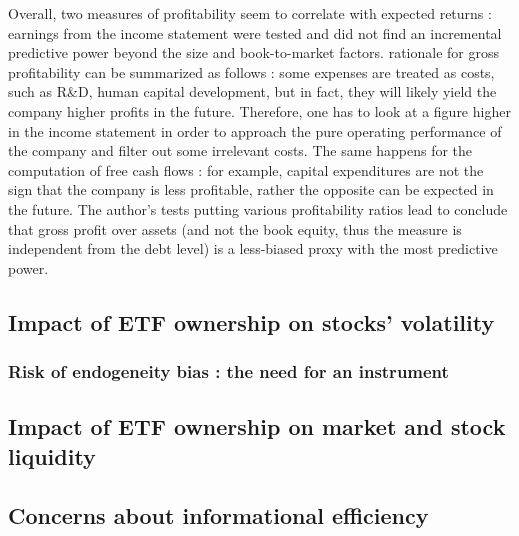 Overall, two measures of profitability seem to correlate with expected returns : earnings from the income statement were tested and \cite{Fama2006} did not find an incremental predictive power beyond the size and book-to-market factors. \cite{Novy-Marx2013} rationale for gross profitability can be summarized as follows : some expenses are treated as costs, such as R\&D, human capital development, but in fact, they will likely yield the company higher profits in the future. Therefore, one has to look at a figure higher in the income statement in order to approach the pure operating performance of the company and filter out some irrelevant costs. The same happens for the computation of free cash flows : for example, capital expenditures are not the sign that the company is less profitable, rather the opposite can be expected in the future. The author's tests putting various profitability ratios lead to conclude that gross profit over assets (and not the book equity, thus the measure is independent from the debt level) is a less-biased proxy with the most predictive power.
\subsection{Impact of ETF ownership on stocks' volatility}
\label{subsec:Method:Volatility}
\subsubsection{Risk of endogeneity bias : the need for an instrument}
\subsection{Impact of ETF ownership on market and stock liquidity}
\label{subsec:Method:Liquidity}
\subsection{Concerns about informational efficiency}
